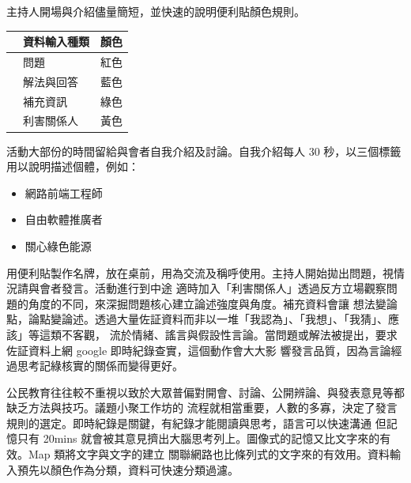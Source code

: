 \documentclass[12pt,a4paper]{article}
\begin{document}
\begin{enumerate}
\begin{enumerate}
主持人開場與介紹儘量簡短，並快速的說明便利貼顏色規則。

\begin{center}
\label{tab:org723e647}
\begin{tabular}{lll}
\toprule
 & 資料輸入種類 & 顏色\\
\midrule
 & 問題 & 紅色\\
 & 解法與回答 & 藍色\\
 & 補充資訊 & 綠色\\
 & 利害關係人 & 黃色\\
\bottomrule
\end{tabular}
\end{center}

活動大部份的時間留給與會者自我介紹及討論。自我介紹每人 30 秒，以三個標籤用以說明描述個體，例如：

\begin{itemize}
\item 網路前端工程師
\item 自由軟體推廣者
\item 關心綠色能源
\end{itemize}

用便利貼製作名牌，放在桌前，用為交流及稱呼使用。主持人開始拋出問題，視情況請與會者發言。活動進行到中途
適時加入「利害關係人」透過反方立場觀察問題的角度的不同，來深掘問題核心建立論述強度與角度。補充資料會讓
想法變論點，論點變論述。透過大量佐証資料而非以一堆「我認為」、「我想」、「我猜」、應該」等這類不客觀，
流於情緒、謠言與假設性言論。當問題或解法被提出，要求佐証資料上網 google 即時紀錄查實，這個動作會大大影
響發言品質，因為言論經過思考記綠核實的關係而變得更好。

公民教育往往較不重視以致於大眾普偏對開會、討論、公開辨論、與發表意見等都缺乏方法與技巧。議題小聚工作坊的
流程就相當重要，人數的多寡，決定了發言規則的選定。即時紀錄是關鍵，有紀錄才能閱讀與思考，語言可以快速溝通
但記憶只有 20mins 就會被其意見擠出大腦思考列上。圖像式的記憶又比文字來的有效。Map 類將文字與文字的建立
關聯網路也比條列式的文字來的有效用。資料輸入預先以顏色作為分類，資料可快速分類過濾。


\end{enumerate}
\end{enumerate}
\end{document}
